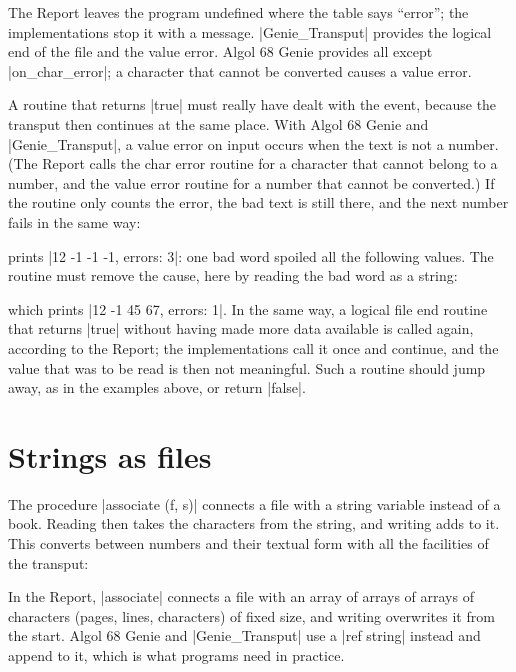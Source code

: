 The Report leaves the program undefined where the table says ``error'';
the implementations stop it with a message. \code|Genie_Transput|
provides the logical end of the file and the value error. Algol 68 Genie
provides all except \code|on_char_error|; a character that cannot be
converted causes a value error.

A routine that returns \code|true| must really have dealt with the
event, because the transput then continues at the same place. With
Algol 68 Genie and \code|Genie_Transput|, a value error on input occurs
when the text is not a number. (The Report calls the char error routine
for a character that cannot belong to a number, and the value error
routine for a number that cannot be converted.) If the routine only
counts the error, the bad text is still there, and the next number fails
in the same way:


\noindent prints \code|12 -1 -1 -1, errors: 3|: one bad word spoiled all the
following values. The routine must remove the cause, here by reading the
bad word as a string:


\noindent which prints \code|12 -1 45 67, errors: 1|. In the same way, a
logical file end routine that returns \code|true| without having made
more data available is called again, according to the Report; the
implementations call it once and continue, and the value that was to be
read is then not meaningful. Such a routine should jump away, as in the examples above, or
return \code|false|.

\section{Strings as files}\label{sec-associate}

The procedure \code|associate (f, s)| connects a file with a string
variable instead of a book. Reading then takes the characters from the
string, and writing adds to it. This converts between numbers and
their textual form with all the facilities of the transput:


\begin{implnote}
In the Report, \code|associate| connects a file with an array of arrays
of arrays of characters (pages, lines, characters) of fixed size, and
writing overwrites it from the start. Algol 68 Genie and
\code|Genie_Transput| use a \code|ref string| instead and append to it,
which is what programs need in practice.
\end{implnote}

